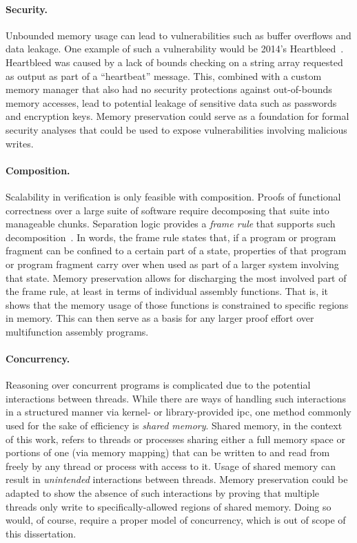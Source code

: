 \paragraph{Security.}
Unbounded memory usage can lead to vulnerabilities
such as buffer overflows and data leakage.
One example of such a vulnerability would be 2014's Heartbleed~\citep{heartbleed}.
Heartbleed was caused by a lack of bounds checking on a string array
requested as output as part of a ``heartbeat'' message.
This, combined with a custom memory manager
that also had no security protections against out-of-bounds memory accesses,
lead to potential leakage of sensitive data such as passwords and encryption keys.
Memory preservation could serve as a foundation for formal security analyses
that could be used to expose vulnerabilities involving malicious writes.

\paragraph{Composition.}\label{sse:composition}
Scalability in verification is only feasible with composition.
Proofs of functional correctness over a large suite of software
require decomposing that suite into manageable chunks.
Separation logic provides a \emph{frame rule} that supports such%
%
decomposition~\citep{o2001local,reynolds2002separation,krebbers2017essence}.
In words, the frame rule states that,
if a program or program fragment can be confined to a certain part of a state,
properties of that program or program fragment carry over
when used as part of a larger system involving that state.
Memory preservation allows for discharging the most involved part of the frame rule,
at least in terms of individual assembly functions.
That is, it shows that the memory usage of those functions is constrained
to specific regions in memory.
This can then serve as a basis
for any larger proof effort over multifunction assembly programs.

\paragraph{Concurrency.}
Reasoning over concurrent programs is complicated
due to the potential interactions between threads.
While there are ways of handling such interactions in a structured manner
via kernel- or library-provided \ac{ipc},
one method commonly used for the sake of efficiency is \emph{shared memory}.
Shared memory, in the context of this work,
refers to threads or processes sharing either a full memory space
or portions of one (via memory mapping)
that can be written to and read from freely by any thread or process with access to it.
Usage of shared memory can result in \emph{unintended} interactions between threads.
Memory preservation could be adapted to show the absence of such interactions
by proving that multiple threads only write
to specifically-allowed regions of shared memory.
Doing so would, of course, require a proper model of concurrency,
which is out of scope of this dissertation.


